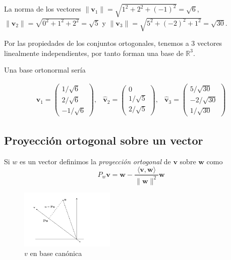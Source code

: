 \documentclass[
]{article}
\begin{document}
La norma de los vectores
\(\|\mathbf{v}_1\|=\sqrt{1^2 + 2^2 + (-1)^2}=\sqrt{6}\),
\(\|\mathbf{v}_2\|=\sqrt{0^2 + 1^2 + 2^2}=\sqrt{5}\) y
\(\|\mathbf{v}_3\|=\sqrt{5^2 + (-2)^2 + 1^2}=\sqrt{30}\).

Por las propiedades de los conjuntos ortogonales, tenemos a 3 vectores
linealmente independientes, por tanto forman una base de
\(\mathbb{R}^3\).

Una base ortonormal sería

\[
\begin{array}{ccc}
\hat{\mathbf{v}}_1 = 
               \begin{pmatrix} 
                1/\sqrt{6} \\ 2/\sqrt{6} \\ -1/\sqrt{6} \end{pmatrix}, & 
\hat{\mathbf{v}}_2 = 
               \begin{pmatrix} 
               0 \\ 1/\sqrt{5} \\ 2/\sqrt{5} \end{pmatrix}, &
\hat{\mathbf{v}}_3 = 
               \begin{pmatrix} 
               5/\sqrt{30} \\ -2/\sqrt{30} \\ 1/\sqrt{30} \end{pmatrix}               
\end{array}
\]

\hypertarget{proyecciuxf3n-ortogonal-sobre-un-vector}{%
\subsection{Proyección ortogonal sobre un
vector}\label{proyecciuxf3n-ortogonal-sobre-un-vector}}

Si \(w\) es un vector definimos la \emph{proyección} \emph{ortogonal} de
\(\mathbf{v}\) sobre \(\mathbf{w}\) como \[
P_w\mathbf{v}= \mathbf{w}-\frac{\langle \mathbf{v}, \mathbf{w}\rangle}{\|\mathbf{w}\|^2}\mathbf{w}
\]

\begin{figure}
\centering
\includegraphics[width=0.4\textwidth,height=\textheight]{Proyecction_Ortogonal.png}
\caption{\(v\) en base canónica}
\end{figure}
\end{document}
